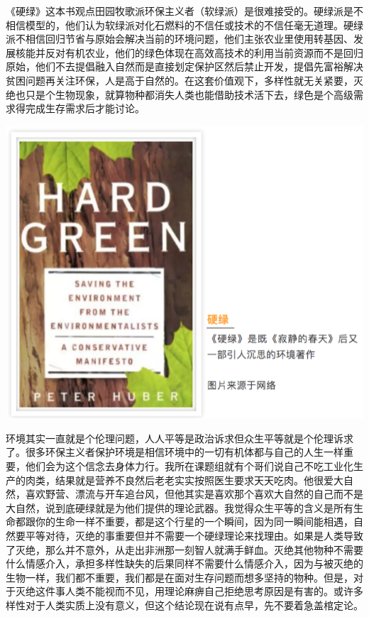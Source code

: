 \documentclass[]{book}
\begin{document}
《硬绿》这本书观点田园牧歌派环保主义者（软绿派）是很难接受的。硬绿派是不相信模型的，他们认为软绿派对化石燃料的不信任或技术的不信任毫无道理。硬绿派不相信回归节省与原始会解决当前的环境问题，他们主张农业里使用转基因、发展核能并反对有机农业，他们的绿色体现在高效高技术的利用当前资源而不是回归原始，他们不去提倡融入自然而是直接划定保护区然后禁止开发，提倡先富裕解决贫困问题再关注环保，人是高于自然的。在这套价值观下，多样性就无关紧要，灭绝也只是个生物现象，就算物种都消失人类也能借助技术活下去，绿色是个高级需求得完成生存需求后才能讨论。

\includegraphics[width=8.33in]{images/miejue6}

环境其实一直就是个伦理问题，人人平等是政治诉求但众生平等就是个伦理诉求了。很多环保主义者保护环境是相信环境中的一切有机体都与自己的人生一样重要，他们会为这个信念去身体力行。我所在课题组就有个哥们说自己不吃工业化生产的肉类，结果就是营养不良然后老老实实按照医生要求天天吃肉。他很爱大自然，喜欢野营、漂流与开车追台风，但他其实是喜欢那个喜欢大自然的自己而不是大自然，说到底硬绿就是为他们提供的理论武器。我觉得众生平等的含义是所有生命都跟你的生命一样不重要，都是这个行星的一个瞬间，因为同一瞬间能相遇，自然要平等对待，灭绝的事重要但并不需要一个硬绿理论来找理由。如果是人类导致了灭绝，那么并不意外，从走出非洲那一刻智人就满手鲜血。灭绝其他物种不需要什么情感介入，承担多样性缺失的后果同样不需要什么情感介入，因为与被灭绝的生物一样，我们都不重要，我们都是在面对生存问题而想多坚持的物种。但是，对于灭绝这件事人类不能视而不见，用理论麻痹自己拒绝思考原因是有害的。或许多样性对于人类实质上没有意义，但这个结论现在说有点早，先不要着急盖棺定论。
\end{document}
